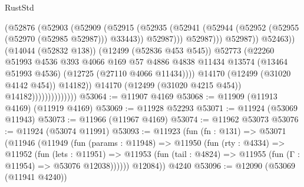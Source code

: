 \begin{lexlean}{RustStd}
\begin{coremodule}
{\begin{coremodule}
{{{{{{{{{{{{{{{{{{{{{{{{{{{{{{{{{{{{{{{{{{{{{{{{{{{{{{{{{{{{{{{{{{{{{{{{{{{{{{{{                                              (@52876
                                                (@52903
                                                  (@52909
                                                    (@52915
                                                      (@52935
                                                        (@52941
                                                          (@52944
                                                            (@52952
                                                              (@52955 (@52970 (@52985 @52987)))
                                                              @33443))
                                                          @52987)))
                                                    @52987)))
                                              @52987))
                                          @52463))
                                      (@14044 (@52832 @138))
                                      (@12499 (@52836 @453 @545))
                                      @52773
                                      (@22260
                                        @51993
                                        @4536
                                        @393
                                        @4066
                                        @169
                                        @57
                                        @4886
                                        @4838
                                        @11434
                                        @13574
                                        (@13464 @51993 @4536)
                                        (@12725 (@27110 @4066 @11434))))
                                    @14170
                                    (@12499 (@31020 @4142 @454))
                                    @14182))
                                @14170
                                (@12499 (@31020 @4215 @454))
                                @14182))))))))))))))
@53064 := @11907 @4169
@53068 := @11909 (@11913 @4169) (@11919 @4169)
@53069 := @11928 @52293
@53071 := @11924 (@53069 @11943)
@53073 := @11966 (@11967 @4169)
@53074 := @11962 @53073
@53076 := @11924 (@53074 @11991)
@53093 := @11923
    (fun (fn : @131) =>
    @53071
      (@11946
        (@11949
          (fun (params : @11948) =>
          @11950
            (fun (rty : @4334) =>
            @11952
              (fun (lets : @11951) =>
              @11953 (fun (tail : @4824) => @11955 (fun (Γ : @11954) => @53076 @12038))))))
        @12084))
    @4240
@53096 := @12090 (@53069 (@11941 @4240))
}}}}}}}}}}}}}}}}}}}}}}}}}}}}}}}}}}}}}}}}}}}}}}}}}}}}}}}}}}}}}}}}}}}}}}}}}}}}}}}}
\end{coremodule}}
\end{coremodule}
\end{lexlean}
